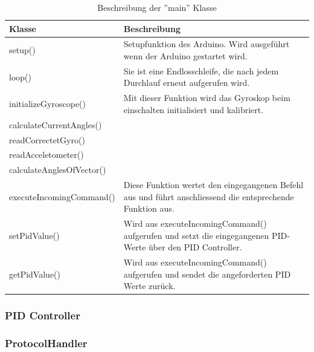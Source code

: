 \begin{table}[H]
  \centering
  \settowidth{}
  \setlength\extrarowheight{2pt}
  \begin{tabulary}{1.0\textwidth}{|L|L|}
    \hline
    \textbf{Klasse} &
    \textbf{Beschreibung}\\
    \hline
    setup() &
    Setupfunktion des Arduino. Wird ausgeführt wenn der Arduino gestartet wird.\\
    \hline
    loop() &
    Sie ist eine Endlosschleife, die nach jedem Durchlauf erneut aufgerufen wird.\\
    \hline
    initializeGyroscope() &
    Mit dieser Funktion wird das Gyroskop beim einschalten initialisiert und kalibriert.\\
    \hline
    calculateCurrentAngles() &
    \\
    \hline
    readCorrectetGyro() &
    \\
    \hline
    readAcceletometer() &
    \\
    \hline
    calculateAnglesOfVector() &
    \\
    \hline
    executeIncomingCommand() &
    Diese Funktion wertet den eingegangenen Befehl aus und führt anschliessend die entsprechende Funktion aus.\\
    \hline
    setPidValue() &
    Wird aus executeIncomingCommand() aufgerufen und setzt die eingegangenen PID-Werte über den PID Controller.\\
    \hline
    getPidValue() &
    Wird aus executeIncomingCommand() aufgerufen und sendet die angeforderten PID Werte zurück.\\
    \hline
  \end{tabulary}
  \caption{Beschreibung der ''main'' Klasse}
\end{table}

\subsubsection{PID Controller}

\subsubsection{ProtocolHandler}
